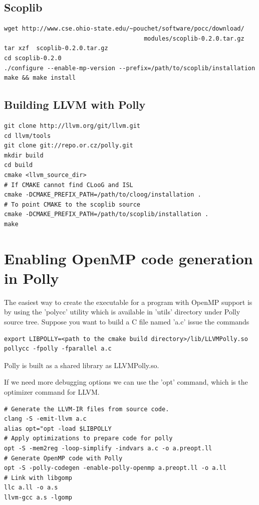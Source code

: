 \subsection{Scoplib}
\begin{verbatim}
wget http://www.cse.ohio-state.edu/~pouchet/software/pocc/download/
                                       modules/scoplib-0.2.0.tar.gz
tar xzf  scoplib-0.2.0.tar.gz
cd scoplib-0.2.0
./configure --enable-mp-version --prefix=/path/to/scoplib/installation
make && make install
\end{verbatim}

\subsection{Building LLVM with Polly}
\begin{verbatim}
git clone http://llvm.org/git/llvm.git
cd llvm/tools
git clone git://repo.or.cz/polly.git
mkdir build
cd build
cmake <llvm_source_dir>
# If CMAKE cannot find CLooG and ISL
cmake -DCMAKE_PREFIX_PATH=/path/to/cloog/installation . 
# To point CMAKE to the scoplib source
cmake -DCMAKE_PREFIX_PATH=/path/to/scoplib/installation . 
make
\end{verbatim}

\section{Enabling OpenMP code generation in Polly}
The easiest way to create the executable for a program with OpenMP support is by using the 'polycc' utility
which is available in 'utils' directory under Polly source tree. Suppose you want to build a C file
named 'a.c' issue the commands
\begin{verbatim}
export LIBPOLLY=<path to the cmake build directory>/lib/LLVMPolly.so
pollycc -fpolly -fparallel a.c
\end{verbatim}Polly is built as a shared library as LLVMPolly.so.

If we need more debugging options we can use the 'opt' command, which is the optimizer command for LLVM.

\begin{verbatim}
# Generate the LLVM-IR files from source code.
clang -S -emit-llvm a.c
alias opt="opt -load $LIBPOLLY
# Apply optimizations to prepare code for polly
opt -S -mem2reg -loop-simplify -indvars a.c -o a.preopt.ll
# Generate OpenMP code with Polly
opt -S -polly-codegen -enable-polly-openmp a.preopt.ll -o a.ll
# Link with libgomp
llc a.ll -o a.s
llvm-gcc a.s -lgomp
\end{verbatim}


